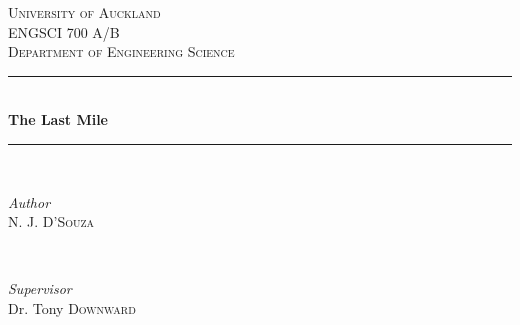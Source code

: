 \documentclass[12pt]{article}
\begin{document}
\begin{titlepage} %
	\newcommand{\HRule}{\rule{\linewidth}{0.5mm}} %
	\center %
	
    
	\textsc{\LARGE University of Auckland}\\[1.5cm] %
	\textsc{\Large ENGSCI 700 A/B}\\[0.5cm] %
	\textsc{\large Department of Engineering Science}\\[0.5cm] %
	
	
	\HRule\\[0.4cm]
	{\huge\bfseries The Last Mile}\\[0.4cm] %
	\HRule\\[1cm]
	
	
	\begin{minipage}[t]{0.4\textwidth}
        \vspace{0pt}
		\begin{flushleft}
			\large
			\textit{Author}\\
            \textsc{N. J. D'Souza} %
		\end{flushleft}
	\end{minipage}
	~
    \begin{minipage}[t]{0.4\textwidth}
        \vspace{0pt}\raggedright
		\begin{flushright}
			\large
			\textit{Supervisor}\\
            Dr. Tony \textsc{Downward} %
		\end{flushright}
	\end{minipage}


\end{titlepage}
\end{document}
